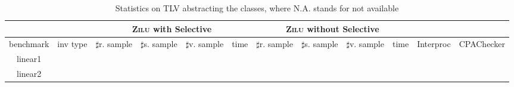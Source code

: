 \begin{table}[t]
\scriptsize
\centering
\caption{Statistics on TLV abstracting the classes, where N.A. stands for not available}
\begin{tabular}{l c | c c c c | c c c c | c c }
\cline{3-10}
& &\multicolumn{4}{|c|}{\textsc{Zilu} with Selective}&\multicolumn{4}{c|}{\textsc{Zilu} without Selective} & & \\
\hline
\multicolumn{1}{|c|}{benchmark}&\multicolumn{1}{|c|}{inv type}& $\sharp$r. sample & $\sharp$s. sample & $\sharp$v. sample & time & $\sharp$r. sample & $\sharp$s. sample & $\sharp$v. sample & time & \multicolumn{1}{|c|}{Interproc} & \multicolumn{1}{|c|}{CPAChecker} \\
\hline %
\multicolumn{1}{|c|}{linear1}         & & & &  &   &  & & &  & &  \\
\multicolumn{1}{|c|}{linear2}         & &  &  &  &   &  & & &  & &  \\
\hline
\end{tabular}
\label{tbl:stats}
\end{table}

